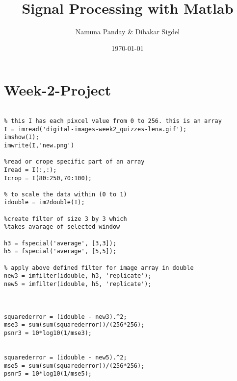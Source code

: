 \documentclass[12 pt]{article}
\title{Signal Processing with Matlab}
\author{Namuna Panday \& Dibakar Sigdel}
\date{\today}
\begin{document}
\maketitle


 \newpage
 \section{Week-2-Project}
 \begin{lstlisting}
 
% this I has each pixcel value from 0 to 256. this is an array
I = imread('digital-images-week2_quizzes-lena.gif');
imshow(I);
imwrite(I,'new.png')

%read or crope specific part of an array
Iread = I(:,:);
Icrop = I(80:250,70:100);

% to scale the data within (0 to 1)
idouble = im2double(I);

%create filter of size 3 by 3 which 
%takes avarage of selected window

h3 = fspecial('average', [3,3]);
h5 = fspecial('average', [5,5]);

% apply above defined filter for image array in double
new3 = imfilter(idouble, h3, 'replicate');
new5 = imfilter(idouble, h5, 'replicate');



squarederror = (idouble - new3).^2;
mse3 = sum(sum(squarederror))/(256*256);
psnr3 = 10*log10(1/mse3);


squarederror = (idouble - new5).^2;
mse5 = sum(sum(squarederror))/(256*256);
psnr5 = 10*log10(1/mse5);



 \end{lstlisting}
 

 \newpage
\end{document}

